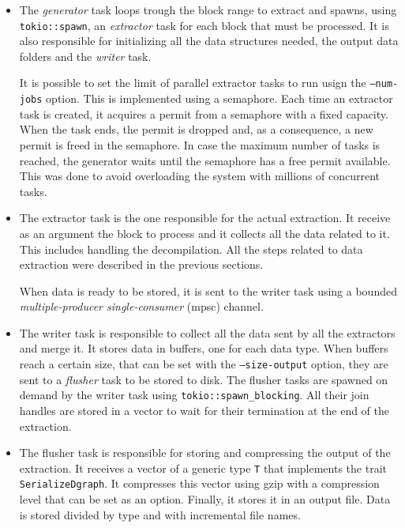 \begin{itemize}
    \item The \textit{generator} task loops trough the block range to extract and spawns, using \texttt{tokio::spawn}, an \textit{extractor} task for each block that must be processed. It is also responsible for initializing all the data structures needed, the output data folders and the \textit{writer} task. 
    
    It is possible to set the limit of parallel extractor tasks to run usign the \texttt{--num-jobs} option. This is implemented using a semaphore. Each time an extractor task is created, it acquires a permit from a semaphore with a fixed capacity. When the task ends, the permit is dropped and, as a consequence, a new permit is freed in the semaphore. In case the maximum number of tasks is reached, the generator waits until the semaphore has a free permit available. This was done to avoid overloading the system with millions of concurrent tasks.

    \item The extractor task is the one responsible for the actual extraction. It receive as an argument the block to process and it collects all the data related to it. This includes handling the decompilation. All the steps related to data extraction were described in the previous sections.

    When data is ready to be stored, it is sent to the writer task using a bounded \textit{multiple-producer single-consumer} (mpsc) channel.

    \item The writer task is responsible to collect all the data sent by all the extractors and merge it. It stores data in buffers, one for each data type. When buffers reach a certain size, that can be set with the \texttt{--size-output} option, they are sent to a \textit{flusher} task to be stored to disk. The flusher tasks are spawned on demand by the writer task using \texttt{tokio::spawn\_blocking}. All their join handles are stored in a vector to wait for their termination at the end of the extraction.

    \item The flusher task is responsible for storing and compressing the output of the extraction. It receives a vector of a generic type \texttt{T} that implements the trait \texttt{SerializeDgraph}. It compresses this vector using gzip with a compression level that can be set as an option. Finally, it stores it in an output file. Data is stored divided by type and with incremental file names.
\end{itemize}

